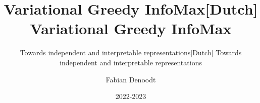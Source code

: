 \documentclass[]{book}
\title{Variational Greedy InfoMax}
\subtitle{Towards independent and interpretable representations}
\author{Fabian Denoodt}
\date{2022-2023}
\begin{document}
\maketitle
\title{[Dutch] Variational Greedy InfoMax}
\subtitle{[Dutch] Towards independent and interpretable representations}
\maketitle

\tableofcontents


\newcommand*\annotatedFigureBoxCustom[8]{\draw[#5,thick,rounded corners] (#1) rectangle (#2);\node at (#4) [fill=#6,thick,shape=circle,draw=#7,inner sep=2pt,font=\sffamily,text=#8] {\textbf{#3}};}

\newcommand*\annotatedFigureBox[4]{\annotatedFigureBoxCustom{#1}{#2}{#3}{#4}{white}{white}{black}{black}}


\newcommand*\annotatedFigureText[5]{\node[draw=none, anchor=south west, text=#2, inner sep=0, text width=#3\linewidth,font=\sffamily\fontsize{#5}{14}\selectfont] at (#1){#4};}


\newenvironment {annotatedFigure}[1]{\centering\begin{tikzpicture}
		\node[anchor=south west,inner sep=0] (image) at (0,0) { #1};\begin{scope}[x={(image.south east)},y={(image.north west)}]}{\end{scope}\end{tikzpicture}}


\newcommand{\vect}[1]{\mathbf{#1}}
\newcommand{\vecti}[1]{\mathbf{#1}^{(i)}}
\newcommand{\kl}[2]{D_{KL} \left( #1 \mid \mid #2 \right)}
\newcommand{\condp}[2]{p(#1 \mid #2)} %
\newcommand{\condq}[2]{q(#1 \mid #2)} %
\newcommand{\probzx}[0]{\condp{\vect{z}}{\vecti{x}}} %
\newcommand{\probxz}[0]{\condp{\vecti{x}}{\vect{z}}} %
\newcommand{\qprobzx}[0]{\condq{\vect{z}}{\vecti{x}}} %
\newcommand{\qprobqxz}[0]{\condq{\vecti{x}}{\vect{z}}} %
\end{document}
